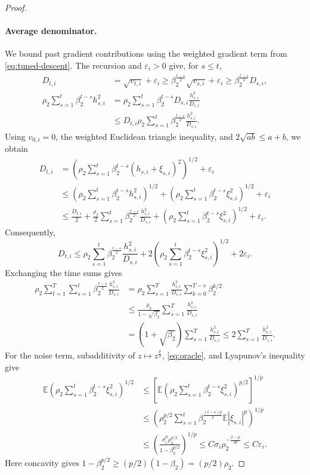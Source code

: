 \documentclass[11pt,letterpaper]{article}
\theoremstyle{definition}
\newcommand{\E}{\mathbb E}
\newcommand{\eps}{\varepsilon}
\begin{document}
\begin{proof}
\paragraph{Average denominator.}
We bound past gradient contributions using the weighted gradient term from
\eqref{eq:tuned-descent}. The recursion and $\eps_i>0$ give, for $s\le t$,
\begin{align*}
D_{t,i}&=\sqrt{v_{t,i}}+\eps_i
\ge\beta_2^{\frac{t-s}{2}}\sqrt{v_{s,i}}+\eps_i
\ge\beta_2^{\frac{t-s}{2}}D_{s,i},\\
\rho_2\sum_{s=1}^t\beta_2^{t-s}h_{s,i}^2
&=\rho_2\sum_{s=1}^t\beta_2^{t-s}D_{s,i}\frac{h_{s,i}^2}{D_{s,i}}\\
&\le D_{t,i}\rho_2\sum_{s=1}^t\beta_2^{\frac{t-s}{2}}
\frac{h_{s,i}^2}{D_{s,i}}.
\end{align*}
Using $v_{0,i}=0$, the weighted Euclidean triangle inequality, and
$2\sqrt{ab}\le a+b$, we obtain
\begin{align*}
D_{t,i}
&=\left(\rho_2\sum_{s=1}^t\beta_2^{t-s}
(h_{s,i}+\xi_{s,i})^2\right)^{1/2}+\eps_i\\
&\le\left(\rho_2\sum_{s=1}^t\beta_2^{t-s}h_{s,i}^2\right)^{1/2}
+\left(\rho_2\sum_{s=1}^t\beta_2^{t-s}\xi_{s,i}^2\right)^{1/2}+\eps_i\\
&\le\frac{D_{t,i}}2
+\frac{\rho_2}{2}\sum_{s=1}^t\beta_2^{\frac{t-s}{2}}
\frac{h_{s,i}^2}{D_{s,i}}
+\left(\rho_2\sum_{s=1}^t\beta_2^{t-s}\xi_{s,i}^2\right)^{1/2}+\eps_i.
\end{align*}
Consequently,
\begin{equation}
D_{t,i}\le\rho_2\sum_{s=1}^t\beta_2^{\frac{t-s}{2}}
\frac{h_{s,i}^2}{D_{s,i}}
+2\left(\rho_2\sum_{s=1}^t\beta_2^{t-s}\xi_{s,i}^2\right)^{1/2}
+2\eps_i.
\label{eq:denom-decomp}
\end{equation}
Exchanging the time sums gives
\begin{align}
\rho_2\sum_{t=1}^T\sum_{s=1}^t\beta_2^{\frac{t-s}{2}}
\frac{h_{s,i}^2}{D_{s,i}}
&=\rho_2\sum_{s=1}^T\frac{h_{s,i}^2}{D_{s,i}}
\sum_{k=0}^{T-s}\beta_2^{k/2}\nonumber\\
&\le\frac{\rho_2}{1-\sqrt{\beta_2}}
\sum_{s=1}^T\frac{h_{s,i}^2}{D_{s,i}}\nonumber\\
&=(1+\sqrt{\beta_2})\sum_{s=1}^T\frac{h_{s,i}^2}{D_{s,i}}
\le2\sum_{s=1}^T\frac{h_{s,i}^2}{D_{s,i}}.
\label{eq:denominator-energy}
\end{align}
For the noise term, subadditivity of $z\mapsto z^{\frac{p}{2}}$,
\eqref{eq:oracle}, and Lyapunov's inequality give
\begin{align*}
\E\left(\rho_2\sum_{s=1}^t\beta_2^{t-s}\xi_{s,i}^2\right)^{1/2}
&\le\left[\E\left(\rho_2\sum_{s=1}^t\beta_2^{t-s}\xi_{s,i}^2\right)^{p/2}\right]^{1/p}\\
&\le\left(\rho_2^{p/2}\sum_{s=1}^t\beta_2^{\frac{(t-s)p}{2}}
\E|\xi_{s,i}|^p\right)^{1/p}\\
&\le\left(\frac{\sigma_i^p\rho_2^{p/2}}{1-\beta_2^{p/2}}\right)^{1/p}
\le C\sigma_i\rho_2^{-\frac{2-p}{2p}}
\le C\eps_i.
\end{align*}
Here concavity gives
$1-\beta_2^{p/2}\ge(p/2)(1-\beta_2)=(p/2)\rho_2$.


\end{proof}
\end{document}
